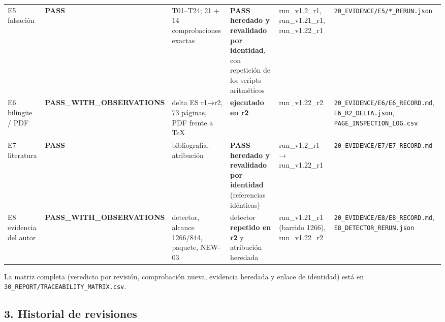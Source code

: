 \documentclass[
]{article}
\begin{document}
{\begin{longtable}[]{@{}llllll@{}}
E5 falsación & \textbf{PASS} & T01--T24; 21 + 14 comprobaciones exactas
& \textbf{PASS heredado y revalidado por identidad}, con repetición de
los scripts aritméticos & run\_v1.2\_r1, run\_v1.21\_r1, run\_v1.22\_r1
& \texttt{20\_EVIDENCE/E5/*\_RERUN.json} \\
E6 bilingüe / PDF & \textbf{PASS\_WITH\_OBSERVATIONS} & delta ES r1→r2,
73 páginas, PDF frente a TeX & \textbf{ejecutado en r2} & run\_v1.22\_r2
& \texttt{20\_EVIDENCE/E6/E6\_RECORD.md}, \texttt{E6\_R2\_DELTA.json},
\texttt{PAGE\_INSPECTION\_LOG.csv} \\
E7 literatura & \textbf{PASS} & bibliografía, atribución & \textbf{PASS
heredado y revalidado por identidad} (referencias idénticas) &
run\_v1.2\_r1 → run\_v1.22\_r1 &
\texttt{20\_EVIDENCE/E7/E7\_RECORD.md} \\
E8 evidencia del autor & \textbf{PASS\_WITH\_OBSERVATIONS} & detector,
alcance 1266/844, paquete, NEW-03 & detector \textbf{repetido en r2} y
atribución heredada & run\_v1.21\_r1 (barrido 1266), run\_v1.22\_r2 &
\texttt{20\_EVIDENCE/E8/E8\_RECORD.md},
\texttt{E8\_DETECTOR\_RERUN.json} \\
\end{longtable}
}

La matriz completa (veredicto por revisión, comprobación nueva,
evidencia heredada y enlace de identidad) está en
\texttt{30\_REPORT/TRACEABILITY\_MATRIX.csv}.

\subsection{3. Historial de revisiones}\label{3-historial-de-revisiones}
\end{document}
